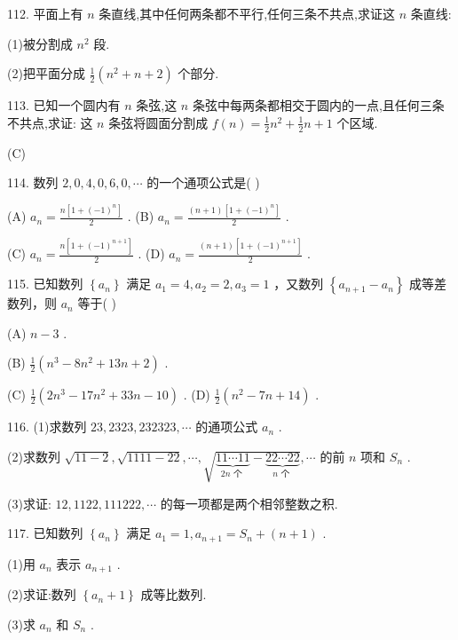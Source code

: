 \documentclass[10pt]{article}
\begin{document}
112. 平面上有 \(n\) 条直线,其中任何两条都不平行,任何三条不共点,求证这 \(n\) 条直线:

(1)被分割成 \({n}^{2}\) 段.

(2)把平面分成 \(\frac{1}{2}\left( {{n}^{2} + n + 2}\right)\) 个部分.

113. 已知一个圆内有 \(n\) 条弦,这 \(n\) 条弦中每两条都相交于圆内的一点,且任何三条不共点,求证: 这 \(n\) 条弦将圆面分割成 \(f\left( n\right)  = \frac{1}{2}{n}^{2} + \frac{1}{2}n + 1\) 个区域.

(C)

114. 数列 \(2,0,4,0,6,0,\cdots\) 的一个通项公式是( )

(A) \({a}_{n} = \frac{n\left\lbrack  {1 + {\left( -1\right) }^{n}}\right\rbrack  }{2}\) . (B) \({a}_{n} = \frac{\left( {n + 1}\right) \left\lbrack  {1 + {\left( -1\right) }^{n}}\right\rbrack  }{2}\) .

(C) \({a}_{n} = \frac{n\left\lbrack  {1 + {\left( -1\right) }^{n + 1}}\right\rbrack  }{2}\) . (D) \({a}_{n} = \frac{\left( {n + 1}\right) \left\lbrack  {1 + {\left( -1\right) }^{n + 1}}\right\rbrack  }{2}\) .

115. 已知数列 \(\left\{  {a}_{n}\right\}\) 满足 \({a}_{1} = 4,{a}_{2} = 2,{a}_{3} = 1\) ，又数列 \(\left\{  {{a}_{n + 1} - {a}_{n}}\right\}\) 成等差数列，则 \({a}_{n}\) 等于( )

(A) \(n - 3\) .

(B) \(\frac{1}{2}\left( {{n}^{3} - 8{n}^{2} + {13n} + 2}\right)\) .

(C) \(\frac{1}{2}\left( {2{n}^{3} - {17}{n}^{2} + {33n} - {10}}\right)\) . (D) \(\frac{1}{2}\left( {{n}^{2} - {7n} + {14}}\right)\) .

116. (1)求数列 \({23},{2323},{232323},\cdots\) 的通项公式 \({a}_{n}\) .

(2)求数列 \(\sqrt{{11} - 2},\sqrt{{1111} - {22}},\cdots ,\sqrt{\underset{{2n}\text{ 个 }}{\underbrace{{11}\cdots {11}}} - \underset{n\text{ 个 }}{\underbrace{{22}\cdots {22}}}},\cdots\) 的前 \(n\) 项和 \({S}_{n}\) .

(3)求证: \({12},{1122},{111222},\cdots\) 的每一项都是两个相邻整数之积.

117. 已知数列 \(\left\{  {a}_{n}\right\}\) 满足 \({a}_{1} = 1,{a}_{n + 1} = {S}_{n} + \left( {n + 1}\right)\) .

(1)用 \({a}_{n}\) 表示 \({a}_{n + 1}\) .

(2)求证:数列 \(\left\{  {{a}_{n} + 1}\right\}\) 成等比数列.

(3)求 \({a}_{n}\) 和 \({S}_{n}\) .
\end{document}
